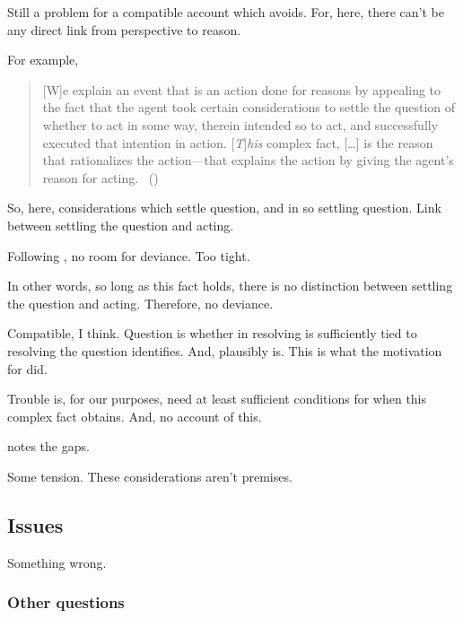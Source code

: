 \begin{note}
  Still a problem for a compatible account which avoids.
  For, here, there can't be any direct link from perspective to reason.

  For example, \citeauthor{Hieronymi:2011aa}

    \begin{quote}
      [W]e explain an event that is an action done for reasons by appealing to the fact that the agent took certain considerations to settle the question of whether to act in some way, therein intended so to act, and successfully executed that intention in action.
    [\emph{T}]\emph{his} complex fact, [\dots] is the reason that rationalizes the action---that explains the action by giving the agent’s reason for acting.%
    \mbox{ }\hfill\mbox{(\citeyear[431]{Hieronymi:2011aa})}
  \end{quote}

  So, here, considerations which settle question, and in so settling question.
  Link between settling the question and acting.

  Following \citeauthor{Hieronymi:2011aa}, no room for deviance.
  Too tight.

  In other words, so long as this fact holds, there is no distinction between settling the question and acting.
  Therefore, no deviance.

  Compatible, I think.
  Question is whether in resolving \qzS{} is sufficiently tied to resolving the question \citeauthor{Hieronymi:2011aa} identifies.
  And, plausibly is.
  This is what the motivation for \qzS{} did.

  Trouble is, for our purposes, need at least sufficient conditions for when this complex fact obtains.
  And, no account of this.

  \citeauthor{Hieronymi:2011aa} notes the gaps.

  Some tension.
  These considerations aren't premises.
\end{note}

\subsection{Issues}
\label{sec:issues}

\begin{note}
  Something wrong.
\end{note}

\subsubsection{Other questions}
\label{sec:other-questions}

